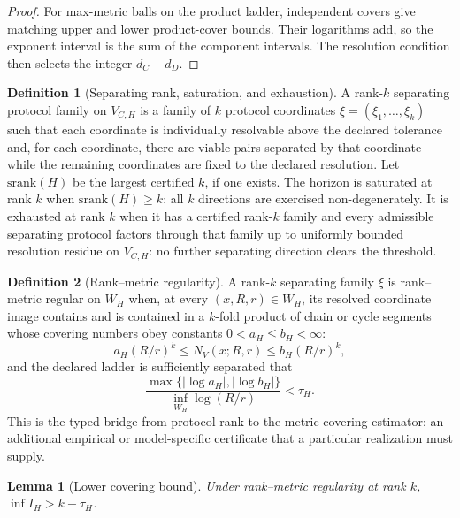 \documentclass[11pt]{article}
\newtheorem{lemma}{Lemma}
\theoremstyle{definition}
\newtheorem{definition}{Definition}
\begin{document}
\begin{proof}
For max-metric balls on the product ladder, independent covers give matching upper and lower product-cover bounds. Their logarithms add, so the exponent interval is the sum of the component intervals. The resolution condition then selects the integer $d_C + d_D$.
\end{proof}

\begin{definition}[Separating rank, saturation, and exhaustion]
A rank-$k$ separating protocol family on $V_{C,H}$ is a family of $k$ protocol coordinates $\xi = (\xi_1, \dots, \xi_k)$ such that each coordinate is individually resolvable above the declared tolerance and, for each coordinate, there are viable pairs separated by that coordinate while the remaining coordinates are fixed to the declared resolution. Let $\mathrm{srank}(H)$ be the largest certified $k$, if one exists. The horizon is saturated at rank $k$ when $\mathrm{srank}(H) \geq k$: all $k$ directions are exercised non-degenerately. It is exhausted at rank $k$ when it has a certified rank-$k$ family and every admissible separating protocol factors through that family up to uniformly bounded resolution residue on $V_{C,H}$: no further separating direction clears the threshold.
\end{definition}

\begin{definition}[Rank--metric regularity]
A rank-$k$ separating family $\xi$ is rank--metric regular on $W_H$ when, at every $(x, R, r) \in W_H$, its resolved coordinate image contains and is contained in a $k$-fold product of chain or cycle segments whose covering numbers obey constants $0 < a_H \leq b_H < \infty$:
\begin{equation}
a_H(R/r)^k \leq N_V(x; R, r) \leq b_H(R/r)^k, \tag{S22}
\end{equation}
and the declared ladder is sufficiently separated that
\begin{equation}
\frac{\max\{|\log a_H|, |\log b_H|\}}{\inf_{W_H} \log(R/r)} < \tau_H. \tag{S23}
\end{equation}
This is the typed bridge from protocol rank to the metric-covering estimator: an additional empirical or model-specific certificate that a particular realization must supply.
\end{definition}

\begin{lemma}[Lower covering bound]
Under rank--metric regularity at rank $k$, $\inf I_H > k - \tau_H$.
\end{lemma}
\end{document}
